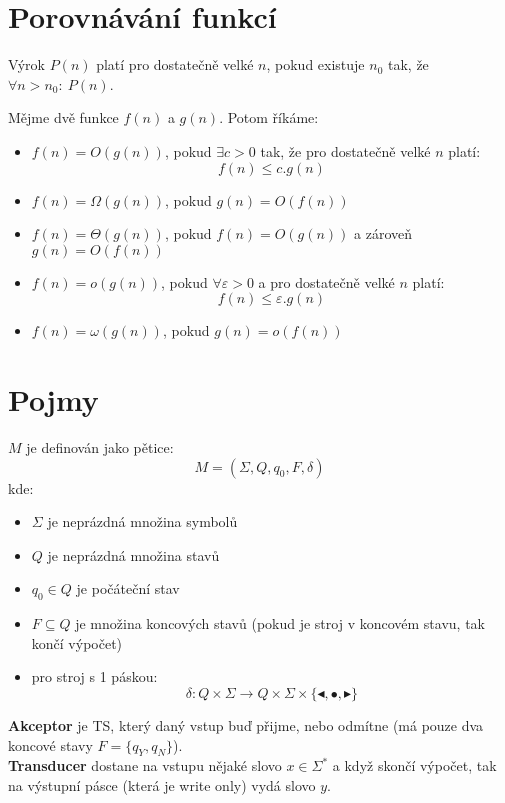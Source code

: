 \documentclass[a4paper]{article}      %
\newenvironment{definition}[1][Definice]{\begin{trivlist}
\item[\hskip \labelsep {\bfseries #1}]}{\end{trivlist}}
\begin{document}
\section*{Porovnávání funkcí}
Výrok $P(n)$ platí pro dostatečně velké $n$, pokud existuje $n_{0}$ tak, že $\forall n > n_{0}:\ P(n)$.

Mějme dvě funkce $f(n)$ a $g(n)$. Potom říkáme:
\begin{itemize}
\item $f(n) = O(g(n))$, pokud $\exists c>0$ tak, že pro dostatečně velké $n$ platí:
\[
f(n) \leq c.g(n)
\]

\item $f(n) = \Omega(g(n))$, pokud $g(n) = O(f(n))$

\item $f(n) = \Theta(g(n))$, pokud $f(n) = O(g(n))$ a zároveň $g(n) = O(f(n))$

\item $f(n) = o(g(n))$, pokud $\forall \varepsilon > 0$ a pro dostatečně velké $n$ platí:
\[
f(n) \leq \varepsilon . g(n)
\]

\item $f(n) = \omega(g(n))$, pokud $g(n) = o(f(n))$
\end{itemize}

\section*{Pojmy}

\begin{definition}[Turingův stroj]
$M$ je definován jako pětice:
\[
M = (\Sigma,Q,q_{0},F,\delta)
\]
kde:
\begin{itemize}
\item $\Sigma$ je neprázdná množina symbolů
\item $Q$ je neprázdná množina stavů
\item $q_{0} \in Q$ je počáteční stav
\item $F \subseteq Q$ je množina koncových stavů (pokud je stroj v koncovém stavu, tak končí výpočet)
\item pro stroj s 1 páskou:
\[
\delta: Q \times \Sigma \rightarrow Q \times \Sigma \times \lbrace \blacktriangleleft, \bullet, \blacktriangleright \rbrace
\]
\end{itemize}
\textbf{Akceptor} je TS, který daný vstup buď přijme, nebo odmítne (má pouze dva koncové stavy $F = \lbrace q_{Y},q_{N} \rbrace$).\\
\textbf{Transducer} dostane na vstupu nějaké slovo $x \in \Sigma^{*}$ a když skončí výpočet,
tak na výstupní pásce (která je write only) vydá slovo $y$.
\end{definition}
\end{document}
